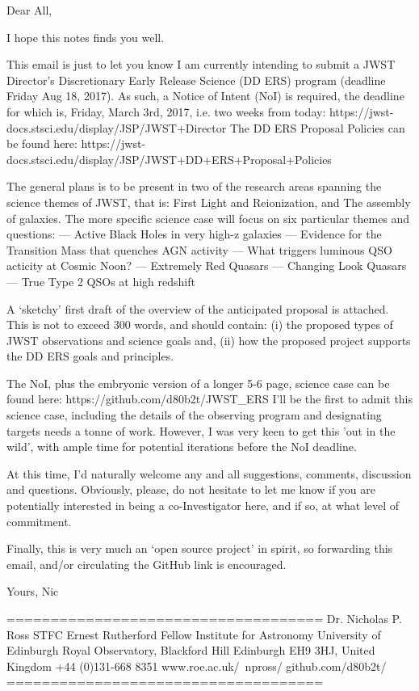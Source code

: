 Dear All, 

I hope this notes finds you well. 

This email is just to let you know I am currently intending to submit a JWST Director's Discretionary Early Release Science (DD ERS) 
program (deadline Friday Aug 18, 2017). As such, a Notice of Intent (NoI) is required, the deadline for which is, Friday, March 3rd, 2017, 
i.e. two weeks from today:
	https://jwst-docs.stsci.edu/display/JSP/JWST+Director%
The DD ERS Proposal Policies can be found here:
	https://jwst-docs.stsci.edu/display/JSP/JWST+DD+ERS+Proposal+Policies

The general plans is to be present in two of the research areas spanning the science themes of JWST, 
that is: First Light and Reionization, and The assembly of galaxies. The more specific science case will 
focus on six particular themes and questions:
	— Active Black Holes in very high-z galaxies 
	— Evidence for the Transition Mass that quenches AGN activity 
	— What triggers luminous QSO acticity at Cosmic Noon? 
	— Extremely Red Quasars  
	— Changing Look Quasars 
	— True Type 2 QSOs at high redshift

A ‘sketchy' first draft of the overview of the anticipated proposal is attached. 
This is not to exceed 300 words, and should contain: 
(i) the proposed types of JWST observations and science goals and, 
(ii) how the proposed project supports the DD ERS goals and principles. 

The NoI, plus the embryonic version of a longer 5-6 page, science case can 
be found here:
	https://github.com/d80b2t/JWST_ERS
I’ll be the first to admit this science case, including the details of the observing program and designating targets 
needs a tonne of work. However, I was very keen to get this 'out in the wild’, with ample time for potential iterations
before the NoI deadline. 

At this time, I’d naturally welcome any and all suggestions, comments, discussion and questions. 
Obviously, please, do not hesitate to let me know if you are potentially interested in being a co-Investigator
here, and if so, at what level of commitment. 

Finally, this is very much an ‘open source project’ in spirit, so forwarding this email, and/or circulating the GitHub 
link is encouraged. 

Yours,
Nic


====================================
  Dr. Nicholas P. Ross
  STFC Ernest Rutherford Fellow
  Institute for Astronomy
  University of Edinburgh
  Royal Observatory, Blackford Hill 
  Edinburgh EH9 3HJ, United Kingdom
  +44 (0)131-668 8351
  www.roe.ac.uk/~npross/
  github.com/d80b2t/
====================================


